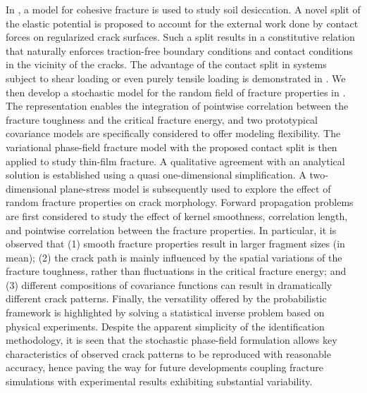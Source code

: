 In , a model for cohesive fracture is used to study soil desiccation. A novel split of the elastic potential is proposed to account for the external work done by contact forces on regularized crack surfaces. Such a split results in a constitutive relation that naturally enforces traction-free boundary conditions and contact conditions in the vicinity of the cracks. The advantage of the contact split in systems subject to shear loading or even purely tensile loading is demonstrated in . We then develop a stochastic model for the random field of fracture properties in . The representation enables the integration of pointwise correlation between the fracture toughness and the critical fracture energy, and two prototypical covariance models are specifically considered to offer modeling flexibility.
The variational phase-field fracture model with the proposed contact split is then applied to study thin-film fracture. A qualitative agreement with an analytical solution is established using a quasi one-dimensional simplification. A two-dimensional plane-stress model is subsequently used to explore the effect of random fracture properties on crack morphology. Forward propagation problems are first considered to study the effect of kernel smoothness, correlation length, and pointwise correlation between the fracture properties. In particular, it is observed that (1) smooth fracture properties result in larger fragment sizes (in mean); (2) the crack path is mainly influenced by the spatial variations of the fracture toughness, rather than fluctuations in the critical fracture energy; and (3) different compositions of covariance functions can result in dramatically different crack patterns. Finally, the versatility offered by the probabilistic framework is highlighted by solving a statistical inverse problem based on physical experiments. Despite the apparent simplicity of the identification methodology, it is seen that the stochastic phase-field formulation allows key characteristics of observed crack patterns to be reproduced with reasonable accuracy, hence paving the way for future developments coupling fracture simulations with experimental results exhibiting substantial variability.

